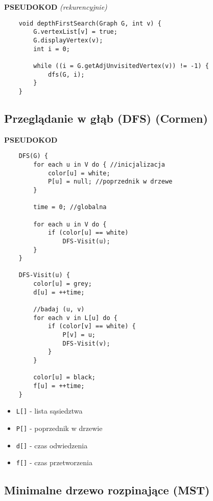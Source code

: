 \documentclass[algorytmy.tex]{subfiles}
\begin{document}
    \textbf{PSEUDOKOD} \textit{(rekurencyjnie)}
    \begin{verbatim}
    void depthFirstSearch(Graph G, int v) {
        G.vertexList[v] = true;
        G.displayVertex(v);
        int i = 0;

        while ((i = G.getAdjUnvisitedVertex(v)) != -1) {
            dfs(G, i);
        }
    }
    \end{verbatim}

\subsection{Przeglądanie w głąb (DFS) (Cormen)}
    \textbf{PSEUDOKOD}%
    \begin{verbatim}
    DFS(G) {
        for each u in V do { //inicjalizacja
            color[u] = white;
            P[u] = null; //poprzednik w drzewe
        }

        time = 0; //globalna

        for each u in V do {
            if (color[u] == white)
                DFS-Visit(u);
        }
    }

    DFS-Visit(u) {
        color[u] = grey;
        d[u] = ++time;

        //badaj (u, v)
        for each v in L[u] do {
            if (color[v] == white) {
                P[v] = u;
                DFS-Visit(v);
            }
        }

        color[u] = black;
        f[u] = ++time;
    }
    \end{verbatim}


\begin{itemize}
    \item \texttt{L[]} - lista sąsiedztwa
    \item \texttt{P[]} - poprzednik w drzewie
    \item \texttt{d[]} - czas odwiedzenia
    \item \texttt{f[]} - czas przetworzenia
\end{itemize}

\pagebreak

\subsection{Minimalne drzewo rozpinające (MST)}
\end{document}
